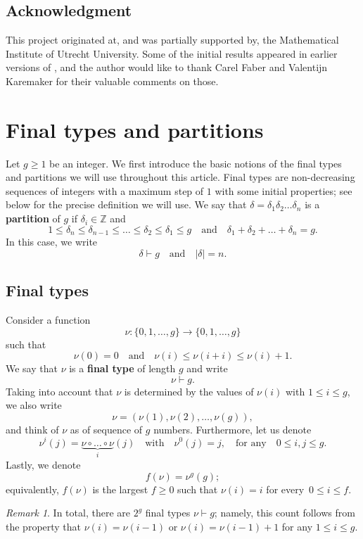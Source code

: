 \documentclass[11pt]{amsart}
\numberwithin{equation}{section}
\theoremstyle{plain}
\newcommand{\Z}{\mathbb{Z}}
\newcommand{\<}{\left \langle}
\renewcommand{\>}{\right \rangle}
\theoremstyle{definition}
\theoremstyle{remark}
\newtheorem{rem}[thm]{Remark}
\begin{document}
\subsection*{Acknowledgment} This project originated at, and was partially supported by, the Mathematical Institute of Utrecht University. Some of the initial results appeared in earlier versions of \cite{dra}, and the author would like to thank Carel Faber and Valentijn Karemaker for their valuable comments on those. 

\section{Final types and partitions}
\label{sec:sec2}
Let $g\geq 1$ be an integer. We first introduce the basic notions of the final types and partitions we will use throughout this article. Final types are non-decreasing sequences of integers with a maximum step of $1$ with some initial properties; see below for the precise definition we will use.
We say that $\delta = \delta_1\delta_2\ldots \delta_n$ is a \textbf{partition} of $g$ if $\delta_i \in \Z$ and $$1 \leq \delta_n \leq \delta_{n - 1} \leq \ldots \leq \delta_2 \leq \delta_1 \leq g\quad \text{and} \quad \delta_1 + \delta_2 + \ldots + \delta_n = g. $$
In this case, we write $$\delta \vdash g \quad \text{and} \quad |\delta| = n.$$


\subsection{Final types}
\label{subsec:final_types}
Consider a function $$\nu: \{0, 1, \ldots, g\} \to \{0, 1, \ldots, g\}$$ such that $$\nu(0) = 0\quad \text{and} \quad \nu(i) \leq \nu(i + i) \leq \nu(i) + 1.$$ We
say that $\nu$ is a \textbf{final type} of length $g$ and write $$\nu \vdash g.$$ Taking into account that $\nu$ is determined by the values of $\nu(i)$ with $1 \leq i \leq g$, we also write $$\nu = (\nu(1), \nu(2), \ldots, \nu(g)), $$
and think of $\nu$ as of sequence of $g$ numbers. 
Furthermore, let us denote $$\nu^i(j) = \underbrace{\nu \circ \ldots \circ \nu}_i(j) \quad \text{with} \quad \nu^0(j) = j, \quad \text{for any}\quad 0 \leq i, j \leq g.$$ 
Lastly, we denote $$f(\nu) = \nu^{g}(g);$$ equivalently, $f(\nu)$ is the largest $f \geq 0$ such that $\nu(i) = i$ for every~${0 \leq i \leq f}$. 

\begin{rem}
In total, there are $2^g$ final types $\nu \vdash g$; namely, this count follows from the property that $\nu(i) = \nu(i - 1)$ or $\nu(i) = \nu(i - 1) + 1$ for any $1 \leq i \leq g$.     
\end{rem}
\end{document}
